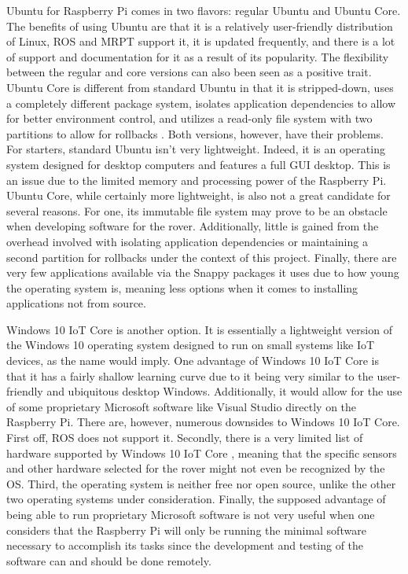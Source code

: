 \documentclass[onecolumn, draftclsnofoot,10pt, compsoc]{IEEEtran}
\begin{document}
Ubuntu for Raspberry Pi comes in two flavors: regular Ubuntu and Ubuntu Core. The benefits of using Ubuntu are that it is a relatively user-friendly distribution of Linux, ROS and MRPT support it, it is updated frequently, and there is a lot of support and documentation for it as a result of its popularity. The flexibility between the regular and core versions can also been seen as a positive trait. Ubuntu Core is different from standard Ubuntu in that it is stripped-down, uses a completely different package system, isolates application dependencies to allow for better environment control, and utilizes a read-only file system with two partitions to allow for rollbacks \cite{UbuntuCore}\cite{UbuntuCoreAnswer}. Both versions, however, have their problems. For starters, standard Ubuntu isn't very lightweight. Indeed, it is an operating system designed for desktop computers and features a full GUI desktop. This is an issue due to the limited memory and processing power of the Raspberry Pi. Ubuntu Core, while certainly more lightweight, is also not a great candidate for several reasons. For one, its immutable file system may prove to be an obstacle when developing software for the rover. Additionally, little is gained from the overhead involved with isolating application dependencies or maintaining a second partition for rollbacks under the context of this project. Finally, there are very few applications available via the Snappy packages it uses due to how young the operating system is, meaning less options when it comes to installing applications not from source. 

Windows 10 IoT Core is another option. It is essentially a lightweight version of the Windows 10 operating system designed to run on small systems like IoT devices, as the name would imply. One  advantage of Windows 10 IoT Core is that it has a fairly shallow learning curve due to it being very similar to the user-friendly and ubiquitous desktop Windows. Additionally, it would allow for the use of some proprietary Microsoft software like Visual Studio directly on the Raspberry Pi. There are, however, numerous downsides to Windows 10 IoT Core. First off, ROS does not support it. Secondly, there is a very limited list of hardware supported by Windows 10 IoT Core \cite{WinHardware}, meaning that the specific sensors and other hardware selected for the rover might not even be recognized by the OS. Third, the operating system is neither free nor open source, unlike the other two operating systems under consideration. Finally, the supposed advantage of being able to run proprietary Microsoft software is not very useful when one considers that the Raspberry Pi will only be running the minimal software necessary to accomplish its tasks since the development and testing of the software can and should be done remotely.
\end{document}
